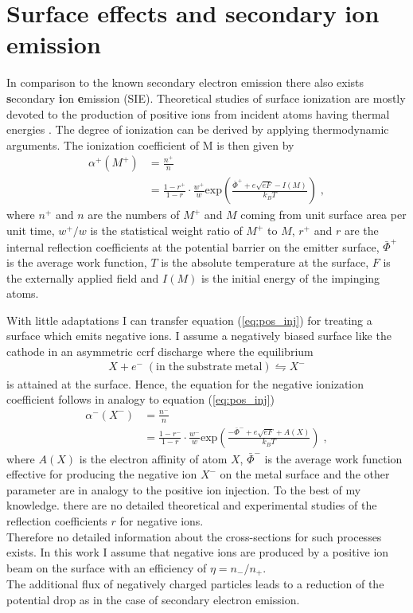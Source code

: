 \section{Surface effects and secondary ion emission}

In comparison to the known secondary electron emission there also exists \textbf{s}econdary \textbf{i}on \textbf{e}mission (SIE).
Theoretical studies of surface ionization are mostly devoted to the production of positive ions from incident atoms having thermal energies \cite{surf_ioniz}. 
The degree of ionization can be derived by applying thermodynamic arguments.
The ionization coefficient of M is then given by
\begin{align}
    \alpha^+(M^+) &= \frac{n^+}{n} \nonumber\\
                  &= \frac{1-r^+}{1-r} \cdot \frac{w^+}{w} \mathrm{exp}\left(
                    \frac{\bar{\Phi}^+ + e \sqrt{eF} - I(M)}{k_B T} \right) \; ,
    \label{eq:pos_inj}
\end{align}
where $n^+$ and $n$ are the numbers of $M^+$ and $M$ coming from unit surface area per unit time, $w^+/w$ is the statistical weight ratio of $M^+$ to $M$, $r^+$ and $r$ are the internal reflection coefficients at the potential barrier on the emitter surface, $\bar{\Phi}^+$ is the average work function,  $T$ is the absolute temperature at the surface, $F$ is the externally applied field and $I(M)$ is the initial energy of the impinging atoms. 
 
With little adaptations I can transfer equation (\ref{eq:pos_inj}) for treating a surface which emits negative ions.
I assume a negatively biased surface like the cathode in an asymmetric ccrf discharge where the equilibrium
\begin{align}
    X + e^- \; \mathrm{(in\; the\; substrate\; metal)} \leftrightharpoons X^-
\end{align}
is attained at the surface.
Hence, the equation for the negative ionization coefficient follows in analogy to equation (\ref{eq:pos_inj})
\begin{align}
    \alpha^-(X^-) &= \frac{n^-}{n} \nonumber\\
                  &= \frac{1-r^-}{1-r} \cdot \frac{w^-}{w} \mathrm{exp}\left( 
                    \frac{-\bar{\Phi}^- + e \sqrt{eF} + A(X)}{k_B T} \right) \; ,
    \label{eq:neg_inj}
\end{align}
where $A(X)$ is the electron affinity of atom $X$, $\bar{\Phi}^-$ is the average work function effective for producing the negative ion $X^-$ on the metal surface and the other parameter are in analogy to the positive ion injection.
To the best of my knowledge. there are no detailed theoretical and experimental studies of the reflection coefficients $r$ for negative ions. \\ 
Therefore no detailed information about the cross-sections for such processes exists.
In this work I assume that negative ions are produced by a positive ion beam on the surface with an efficiency of $\eta=n_-/n_+$.\\ 
The additional flux of negatively charged particles leads to a reduction of the potential drop as in the case of secondary electron emission.

